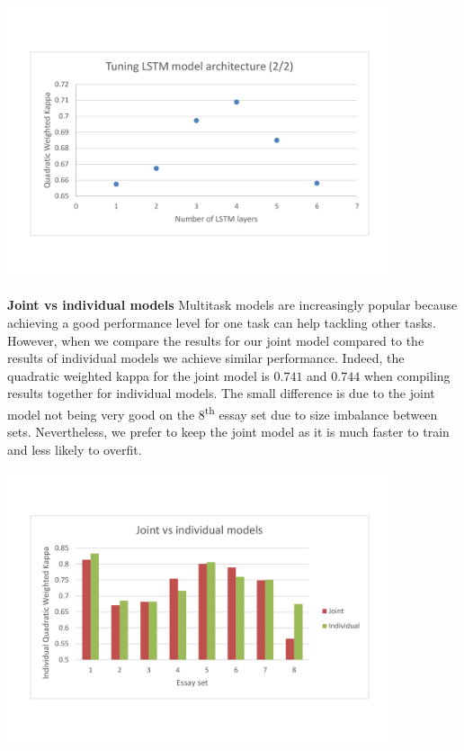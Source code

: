 \documentclass[a4paper,12pt,english]{article}
\begin{document}
\begin{center}
\vspace*{-1.5cm}
\includegraphics[width=0.85\textwidth]{fig/tune_lstm_arch_2.pdf}
\vspace*{-1.5cm}
\end{center}

\textbf{Joint vs individual models} Multitask models are increasingly popular because achieving a good performance level for one task can help tackling other tasks. However, when we compare the results for our joint model compared to the results of individual models we achieve similar performance. Indeed, the quadratic weighted kappa for the joint model is $0.741$ and $0.744$ when compiling results together for individual models. The small difference is due to the joint model not being very good on the $8$\textsuperscript{th} essay set due to size imbalance between sets. Nevertheless, we prefer to keep the joint model as it is much faster to train and less likely to overfit.

\begin{center}
\vspace*{-1.5cm}
\includegraphics[width=0.85\textwidth]{fig/joint_vs_indiv.pdf}
\vspace*{-1.5cm}
\end{center}
\end{document}
